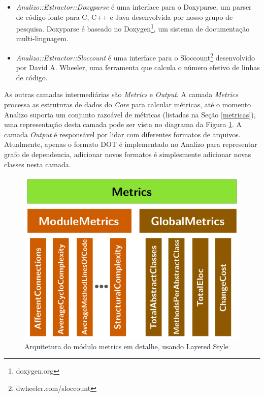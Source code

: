 \begin{itemize}

  \item {\it Analizo::Extractor::Doxyparse} é uma interface para o Doxyparse,
  um parser de código-fonte para C, C++ e Java desenvolvida por nosso grupo de
  pesquisa\cite{Costa2009}. Doxyparse é baseado no
  Doxygen\footnote{doxygen.org}, um sistema de documentação multi-linguagem.

  \item {\it Analizo::Extractor::Sloccount} é uma interface para o
  Sloccount\footnote{dwheeler.com/sloccount} desenvolvido por David A. Wheeler,
  uma ferramenta que calcula o número efetivo de linhas de código.

\end{itemize}

As outras camadas intermediárias são {\it Metrics} e {\it Output}. A camada
{\it Metrics} processa as estruturas de dados do {\it Core} para calcular
métricas, até o momento Analizo suporta um conjunto razoável de métricas
(listadas na Seção \ref{metricas}), uma representação desta camada pode ser
vista no diagrama da Figura \ref{arquitetura-metrics-analizo}. A camada {\it
Output} é responsável por lidar com diferentes formatos de arquivos.
Atualmente, apenas o formato DOT é implementado no Analizo para representar
grafo de dependencia, adicionar novos formatos é simplesmente adicionar novas
classes nesta camada.

\begin{figure}[H]
\center
\includegraphics[scale=0.4]{imagens/analizo-metrics-architecture.png}
\caption{Arquitetura do módulo metrics em detalhe, usando Layered Style \cite{Clements2002}}
\label{arquitetura-metrics-analizo}
\end{figure}

